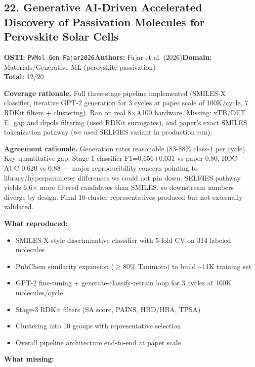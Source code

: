 \subsection{22. Generative AI-Driven Accelerated Discovery of Passivation Molecules for Perovskite Solar Cells}
\textbf{OSTI:} \texttt{PVMol-Gen-Fajar2026}\quad\textbf{Authors:} Fajar et al. (2026)\quad\textbf{Domain:} Materials/Generative ML (perovskite passivation)\\
\quad{}\quad\textbf{Total:} 12/20\par\smallskip
\noindent\textbf{Coverage rationale.} Full three-stage pipeline implemented (SMILES-X classifier, iterative GPT-2 generation for 3 cycles at paper scale of 100K/cycle, 7 RDKit filters + clustering). Ran on real 8$\times$A100 hardware. Missing: xTB/DFT E\_gap and dipole filtering (used RDKit surrogates), and paper's exact SMILES tokenization pathway (we used SELFIES variant in production run).\par
\noindent\textbf{Agreement rationale.} Generation rates reasonable (83-88\% class-1 per cycle). Key quantitative gap: Stage-1 classifier F1=0.656$\pm$0.031 vs paper 0.80, ROC-AUC 0.620 vs 0.88 --- major reproducibility concern pointing to library/hyperparameter differences we could not pin down. SELFIES pathway yields 6.6$\times$ more filtered candidates than SMILES, so downstream numbers diverge by design. Final 10-cluster representatives produced but not externally validated.\par\smallskip
\noindent\textbf{What reproduced:}
\begin{itemize}[leftmargin=1.4em,itemsep=0.2em,topsep=0.2em]
\item SMILES-X-style discriminative classifier with 5-fold CV on 314 labeled molecules
\item PubChem similarity expansion ($\geq$80\% Tanimoto) to build \textasciitilde{}11K training set
\item GPT-2 fine-tuning + generate-classify-retrain loop for 3 cycles at 100K molecules/cycle
\item Stage-3 RDKit filters (SA score, PAINS, HBD/HBA, TPSA)
\item Clustering into 10 groups with representative selection
\item Overall pipeline architecture end-to-end at paper scale
\end{itemize}\noindent\textbf{What missing:}
